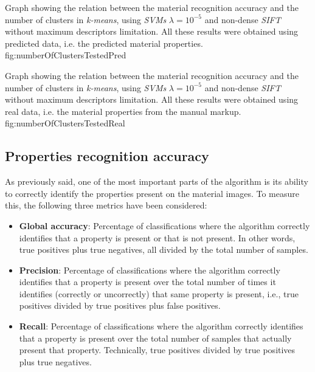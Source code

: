 {Graph showing the relation between the material recognition accuracy and the number of clusters in \emph{k-means}, using \emph{SVMs} $\lambda=10^{-5}$ and non-dense \emph{SIFT} without maximum descriptors limitation. All these results were obtained using predicted data, i.e. the predicted material properties.}
{fig:numberOfClustersTestedPred}

{Graph showing the relation between the material recognition accuracy and the number of clusters in \emph{k-means}, using \emph{SVMs} $\lambda=10^{-5}$ and non-dense \emph{SIFT} without maximum descriptors limitation. All these results were obtained using real data, i.e. the material properties from the manual markup.}
{fig:numberOfClustersTestedReal}


\subsection{Properties recognition accuracy}

As previously said, one of the most important parts of the algorithm is its ability to correctly identify the properties present on the material images. To measure this, the following three metrics have been considered:

\begin{itemize}
    \item \textbf{Global accuracy}: Percentage of classifications where the algorithm correctly identifies that a property is present or that is not present. In other words, true positives plus true negatives, all divided by the total number of samples.
    \item \textbf{Precision}: Percentage of classifications where the algorithm correctly identifies that a property is present over the total number of times it identifies (correctly or uncorrectly) that same property is present, i.e., true positives divided by true positives plus false positives.
    \item \textbf{Recall}: Percentage of classifications where the algorithm correctly identifies that a property is present over the total number of samples that actually present that property. Technically, true positives divided by true positives plus true negatives.
\end{itemize}

